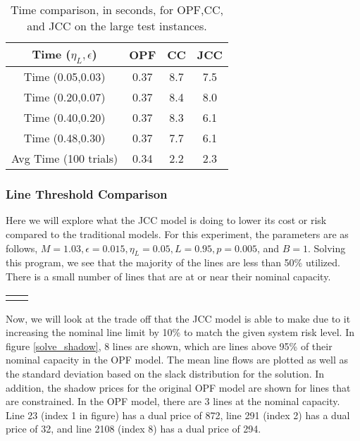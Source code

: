 \begin{table}
\centering
\begin{tabular}{| c| c c c| }
\hline
Time ($\eta_L,\epsilon$) & OPF & CC & JCC \\
\hline
\hline
Time (0.05,0.03)& 0.37  & 8.7 & 7.5 \\
Time (0.20,0.07)& 0.37  & 8.4 & 8.0 \\
Time (0.40,0.20)& 0.37  & 8.3 & 6.1 \\
Time (0.48,0.30)& 0.37  & 7.7 & 6.1 \\
\hline
\hline
Avg Time (100 trials)& 0.34  & 2.2 & 2.3 \\
\hline
\end{tabular}
\caption{Time comparison, in seconds, for OPF,CC, and JCC on the large test instances.}\label{solve_time}
\end{table}


\subsubsection*{Line Threshold Comparison}
Here we will explore what the JCC model is doing to lower its cost or risk compared to the traditional models.  For this experiment, the parameters are as follows, $M=1.03, \epsilon=0.015, \eta_L=0.05, L=0.95, p=0.005$, and $B=1$.  Solving this program, we see that the majority of the lines are less than 50\% utilized.  There is a small number of lines that are at or near their nominal capacity.


\begin{tabular}{c c}

&

\end{tabular}


Now, we will look at the trade off that the JCC model is able to make due to it increasing the nominal line limit by 10\% to match the given system risk level.  In figure \ref{solve_shadow}, 8 lines are shown, which are lines above 95\% of their nominal capacity in the OPF model.  The mean line flows are plotted as well as the standard deviation based on the slack distribution for the solution.  
In addition, the shadow prices for the original OPF model are shown for lines that are constrained.  In the OPF model, there are 3 lines at the nominal capacity.  Line 23 (index 1 in figure) has a dual price of 872, line 291 (index 2) has a dual price of 32, and line 2108 (index 8) has a dual price of 294.


